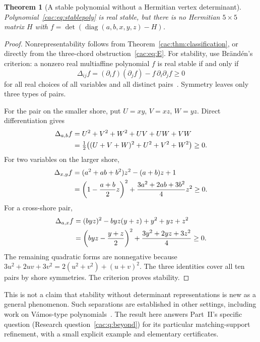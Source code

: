 \documentclass[11pt]{article}
\numberwithin{equation}{section}
\newtheorem{theorem}{Theorem}[section]
\theoremstyle{definition}
\newcommand{\diag}{\operatorname{diag}}
\begin{document}
\begin{theorem}[A stable polynomial without a Hermitian vertex determinant]
\label{cac:thm:stable23}
Polynomial~\eqref{cac:eq:stablepoly} is real stable, but there is no Hermitian $5\times5$ matrix $H$ with $f=\det(\diag(a,b,x,y,z)-H)$.
\end{theorem}
\begin{proof}
Nonrepresentability follows from Theorem~\ref{cac:thm:classification}, or directly from the three-chord obstruction~\eqref{cac:eq:E}. For stability, use Br\"and\'en's criterion: a nonzero real multiaffine polynomial $f$ is real stable if and only if
\[
 \Delta_{ij}f=(\partial_i f)(\partial_j f)-f\,\partial_i\partial_j f\ge0
\]
for all real choices of all variables and all distinct pairs~\cite[Theorem 5.6]{Branden}. Symmetry leaves only three types of pairs.

For the pair on the smaller shore, put $U=xy$, $V=xz$, $W=yz$. Direct differentiation gives
\begin{align}
 \Delta_{a,b}f
 &=U^2+V^2+W^2+UV+UW+VW\notag\\
 &=\tfrac12\bigl((U+V+W)^2+U^2+V^2+W^2\bigr)\ge0.
 \label{cac:eq:SOSaa}
\end{align}
For two variables on the larger shore,
\begin{align}
 \Delta_{x,y}f
 &=(a^2+ab+b^2)z^2-(a+b)z+1\notag\\
 &=\left(1-\frac{a+b}{2}z\right)^2
       +\frac{3a^2+2ab+3b^2}{4}z^2\ge0.
 \label{cac:eq:SOSbb}
\end{align}
For a cross-shore pair,
\begin{align}
 \Delta_{a,x}f
 &=(byz)^2-byz(y+z)+y^2+yz+z^2\notag\\
 &=\left(byz-\frac{y+z}{2}\right)^2
       +\frac{3y^2+2yz+3z^2}{4}\ge0.
 \label{cac:eq:SOSab}
\end{align}
The remaining quadratic forms are nonnegative because $3u^2+2uv+3v^2=2(u^2+v^2)+(u+v)^2$. The three identities cover all ten pairs by shore symmetries. The criterion proves stability.
\end{proof}

This is not a claim that stability without determinant representations is new as a general phenomenon. Such separations are established in other settings, including work on V\'amos-type polynomials~\cite{BVY}. The result here answers Part~II's specific question (Research question~\ref{cac:q:beyond}) for its particular matching-support refinement, with a small explicit example and elementary certificates.
\end{document}
